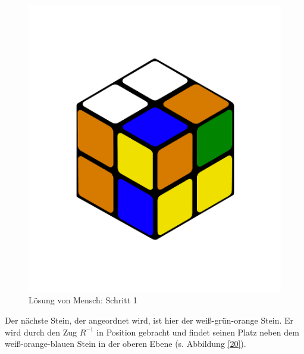 \documentclass[12pt,a4paper, usenames, dvipsnames]{article}
\begin{document}
\begin{figure}[h]
\centering
\includegraphics[scale=0.12]{0201.png}
\caption[Lösung von Mensch: Schritt 1]{Lösung von Mensch: Schritt 1}
\label{19}
\end{figure}

Der nächste Stein, der angeordnet wird, ist hier der weiß-grün-orange Stein. Er wird durch den Zug $R^{-1}$ in Position gebracht und findet seinen Platz neben dem weiß-orange-blauen Stein in der oberen Ebene (s. Abbildung \ref{20}).
 
\end{document}
